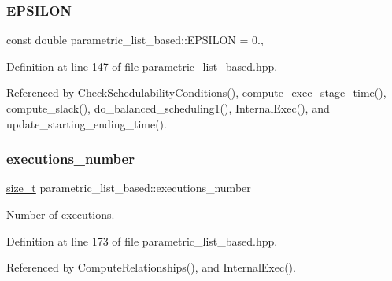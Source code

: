 \subsubsection{\texorpdfstring{E\+P\+S\+I\+L\+ON}{EPSILON}}
{\footnotesize\ttfamily const double parametric\+\_\+list\+\_\+based\+::\+E\+P\+S\+I\+L\+ON = 0.\hspace{0.3cm}{\ttfamily [static]}, {\ttfamily [private]}}



Definition at line 147 of file parametric\+\_\+list\+\_\+based.\+hpp.



Referenced by Check\+Schedulability\+Conditions(), compute\+\_\+exec\+\_\+stage\+\_\+time(), compute\+\_\+slack(), do\+\_\+balanced\+\_\+scheduling1(), Internal\+Exec(), and update\+\_\+starting\+\_\+ending\+\_\+time().

\mbox{\label{classparametric__list__based_a4df4ac930c63d346ceb4e79d6283de11}} 
\subsubsection{\texorpdfstring{executions\+\_\+number}{executions\_number}}
{\footnotesize\ttfamily \hyperlink{tutorial__fpt__2017_2intro_2sixth_2test_8c_a7c94ea6f8948649f8d181ae55911eeaf}{size\+\_\+t} parametric\+\_\+list\+\_\+based\+::executions\+\_\+number\hspace{0.3cm}{\ttfamily [private]}}



Number of executions. 



Definition at line 173 of file parametric\+\_\+list\+\_\+based.\+hpp.



Referenced by Compute\+Relationships(), and Internal\+Exec().

\mbox{\label{classparametric__list__based_af8c4c141aa0606a9dcf33b234f4b98da}} 
